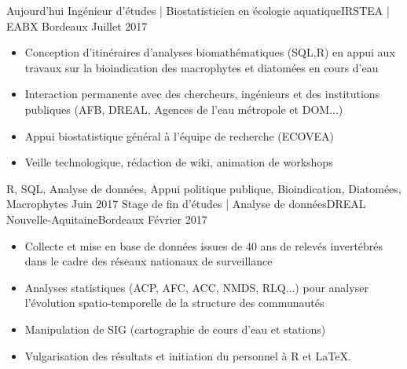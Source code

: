 %
%
%
\begin{experiences}
  \experience
    {Aujourd'hui}   {Ingénieur d'études | Biostatisticien en écologie aquatique}{IRSTEA | EABX }{Bordeaux}
    {Juillet 2017} {
                      \begin{itemize}                    
                        \item Conception d’itinéraires d’analyses biomathématiques (SQL,R) en appui aux travaux sur la bioindication des macrophytes et diatomées en cours d'eau
                        \item Interaction permanente avec des chercheurs, ingénieurs et des institutions publiques (AFB, DREAL, Agences de l’eau métropole et DOM...)   
                        \item Appui biostatistique général à l'équipe de recherche (ECOVEA)                      
                        \item Veille technologique, rédaction de wiki, animation de workshops                                                                 
                      \end{itemize}
                    }
                    {R, SQL, Analyse de données, Appui politique publique, Bioindication, Diatomées, Macrophytes}
  \emptySeparator
  \experience
    {Juin 2017} {Stage de fin d'études | Analyse de données}{DREAL Nouvelle-Aquitaine}{Bordeaux}
    {Février 2017}    {
                      \begin{itemize}              
                        \item Collecte et mise en base de données issues de 40 ans de relevés invertébrés dans le cadre des réseaux nationaux de surveillance               
                        \item Analyses statistiques (ACP, AFC, ACC, NMDS, RLQ...) pour analyser l’évolution spatio-temporelle de la structure des communautés 
                        \item Manipulation de SIG (cartographie de cours d’eau et stations)               
                        \item Vulgarisation des résultats et initiation du personnel à R et LaTeX.                                                                  

\end{itemize}}
\end{experiences}
